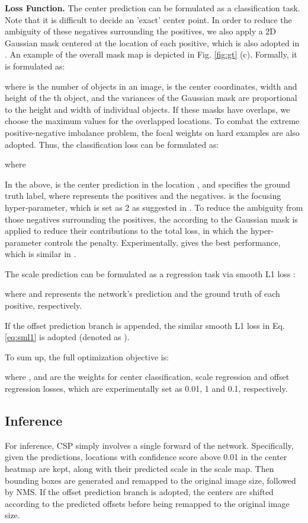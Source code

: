 \documentclass[review]{elsarticle}
\begin{document}
\textbf{Loss Function.}
The center prediction can be formulated as a classification task. Note that it is difficult to decide an 'exact' center point. In order to reduce the ambiguity of these negatives surrounding the positives, we also apply a 2D Gaussian mask  centered at the location of each positive, which is also adopted in \cite{Law_2018_ECCV,Song_2018_ECCV}. An example of the overall mask map  is depicted in Fig. \ref{fig:gt} (c). Formally, it is formulated as:

where  is the number of objects in an image,  is the center coordinates, width and height of the th object, and the variances  of the Gaussian mask are proportional to the height and width of individual objects. If these masks have overlaps, we choose the maximum values for the overlapped locations.
To combat the extreme positive-negative imbalance problem, the focal weights \cite{lin2017focal} on hard examples are also adopted.
Thus, the classification loss can be formulated as:

where



In the above,  is the center prediction in the location , and  specifies the ground truth label, where  represents the positives and  the negatives.  is the focusing hyper-parameter, which is set as 2 as suggested in \cite{lin2017focal}. To reduce the ambiguity from those negatives surrounding the positives, the  according to the Gaussian mask  is applied to reduce their contributions to the total loss, in which the hyper-parameter  controls the penalty. Experimentally,  gives the best performance, which is similar in \cite{Law_2018_ECCV}.

The scale prediction can be formulated as a regression task via smooth L1 loss \cite{girshick2015fast}:


where  and  represents the network's prediction and the ground truth of each positive, respectively.

If the offset prediction branch is appended, the similar smooth L1 loss in Eq. \ref{eq:sml1} is adopted (denoted as ).

To sum up, the full optimization objective is:

where ,  and  are the weights for center classification, scale regression and offset regression losses, which are experimentally set as 0.01, 1 and 0.1, respectively.

\subsection{Inference}
For inference, CSP simply involves a single forward of the network. Specifically, given the predictions, locations with confidence score above 0.01 in the center heatmap are kept, along with their predicted scale in the scale map. Then bounding boxes are generated and remapped to the original image size, followed by NMS. If the offset prediction branch is adopted, the centers are shifted according to the predicted offsets before being remapped to the original image size.
\end{document}
